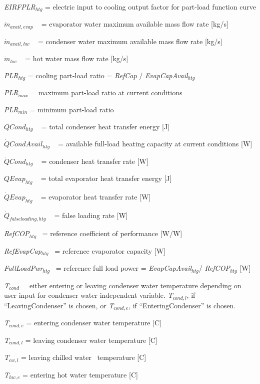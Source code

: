 \emph{EIRFPLR\(_{htg}\)} = electric input to cooling output factor for part-load function curve

\({\dot m_{avail,evap}}\) ~ = evaporator water maximum available mass flow rate {[}kg/s{]}

\({\dot m_{avail,hw}}\) ~ = condenser water maximum available mass flow rate {[}kg/s{]}

\({\dot m_{hw}}\) ~ = hot water mass flow rate {[}kg/s{]}

\emph{PLR\(_{htg}\)} = cooling part-load ratio = \emph{RefCap} / \emph{EvapCapAvail\(_{htg}\)}

\emph{PLR\(_{max}\)} = maximum part-load ratio at current conditions

\emph{PLR\(_{min}\)} = minimum part-load ratio

\(QCon{d_{htg}}\) ~ = total condenser heat transfer energy {[}J{]}

\(\dot QCondAvai{l_{htg}}\) ~ = available full-load heating capacity at current conditions {[}W{]}

\(\dot QCon{d_{htg}}\) ~ = condenser heat transfer rate {[}W{]}

\(QEva{p_{htg}}\) ~ = total evaporator heat transfer energy {[}J{]}

\(\dot QEva{p_{htg}}\) ~ = evaporator heat transfer rate {[}W{]}

\({\dot Q_{falseloading,htg}}\) ~ = false loading rate {[}W{]}

\emph{RefCOP\(_{htg}\)}~ = reference coefficient of performance {[}W/W{]}

\emph{RefEvapCap\(_{htg}\)}~ = reference evaporator capacity {[}W{]}

\emph{FullLoadPwr\(_{htg}\)}~ = reference full load power = \emph{EvapCapAvail\(_{htg}\)}/ \emph{RefCOP\(_{htg}\)} {[}W{]}

\emph{T\(_{cond}\)} = either entering or leaving condenser water temperature depending on user input for condenser water independent variable. \emph{T\(_{cond,l}\)}, if ``LeavingCondenser'' is chosen, or \emph{T\(_{cond,e}\)}, if ``EnteringCondenser'' is chosen.

\emph{T\(_{cond,e}\)} = entering condenser water temperature {[}C{]}

\emph{T\(_{cond,l}\)} = leaving condenser water temperature {[}C{]}

\emph{T\(_{cw,l}\)} = leaving chilled water~ temperature {[}C{]}

\emph{T\(_{hw,e}\)} = entering hot water temperature {[}C{]}

